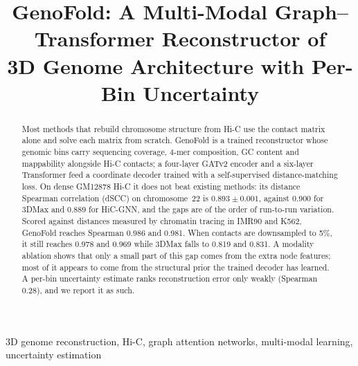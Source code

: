 \documentclass[conference]{IEEEtran}
\begin{document}
\title{GenoFold: A Multi-Modal Graph--Transformer Reconstructor of\\ 3D Genome
Architecture with Per-Bin Uncertainty}

\author{%
\and
{}
}

\maketitle

\begin{abstract}
Most methods that rebuild chromosome structure from Hi-C use the contact
matrix alone and solve each matrix from scratch. GenoFold is a trained
reconstructor whose genomic bins carry sequencing coverage, 4-mer
composition, GC content and mappability alongside Hi-C contacts; a
four-layer GATv2 encoder and a six-layer Transformer feed a coordinate
decoder trained with a self-supervised distance-matching loss. On dense
GM12878 Hi-C it does not beat existing methods: its distance Spearman
correlation (dSCC) on chromosome~22 is $0.893 \pm 0.001$, against 0.900
for 3DMax and 0.889 for HiC-GNN, and the gaps are of the order of
run-to-run variation. Scored against distances measured by chromatin
tracing in IMR90 and K562, GenoFold reaches Spearman 0.986 and 0.981. When
contacts are downsampled to 5\%, it still reaches 0.978 and 0.969 while
3DMax falls to 0.819 and 0.831. A modality ablation shows that only a
small part of this gap comes from the extra node features; most of it
appears to come from the structural prior the trained decoder has
learned. A per-bin uncertainty estimate ranks reconstruction error only
weakly (Spearman 0.28), and we report it as such.
\end{abstract}

\begin{IEEEkeywords}
3D genome reconstruction, Hi-C, graph attention networks, multi-modal
learning, uncertainty estimation
\end{IEEEkeywords}
\end{document}
